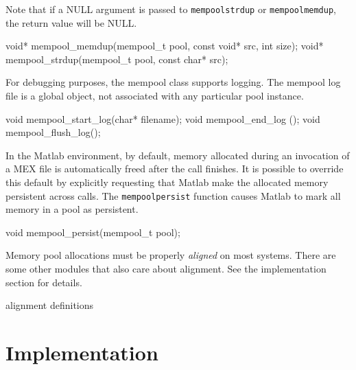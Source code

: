 Note that if a NULL argument is passed to {\tt{}mempool{}strdup}
or {\tt{}mempool{}memdup}, the return value will be NULL.

\nwenddocs{}\plusendmoddef
void* mempool_memdup(mempool_t pool, const void* src, int size);
void* mempool_strdup(mempool_t pool, const char* src);

\nwendcode{}\nwdocspar

For debugging purposes, the mempool class supports logging.
The mempool log file is a global object, not associated with
any particular pool instance.

\nwenddocs{}\plusendmoddef
void mempool_start_log(char* filename);
void mempool_end_log  ();
void mempool_flush_log();

\nwendcode{}\nwdocspar

In the Matlab environment, by default, memory allocated during an
invocation of a MEX file is automatically freed after
the call finishes.  It is possible to override this default
by explicitly requesting that Matlab make the allocated memory
persistent across calls.  The {\tt{}mempool{}persist} function
causes Matlab to mark all memory in a pool as persistent.

\nwenddocs{}\plusendmoddef
void mempool_persist(mempool_t pool);

\nwendcode{}\nwdocspar

Memory pool allocations must be properly \emph{aligned} on most
systems.  There are some other modules that also care about
alignment.  See the implementation section for details.

\nwenddocs{}\endmoddef
\LA{}alignment definitions~{\nwtagstyle{}}\RA{}
\nwendcode{}\nwdocspar


\section{Implementation}

